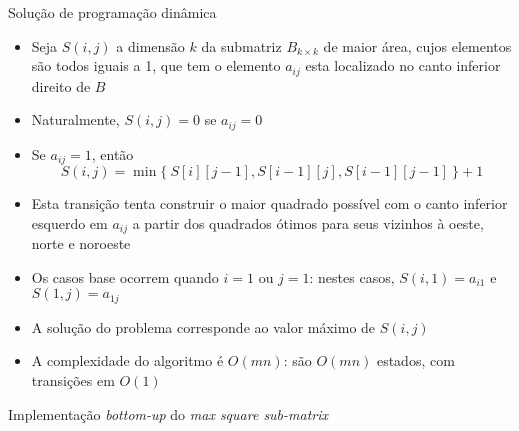 \begin{frame}[fragile]{Solução de programação dinâmica}

    \begin{itemize}
        \item Seja $S(i, j)$ a dimensão $k$ da submatriz $B_{k\times k}$ de maior área, cujos
            elementos são todos iguais a 1, que tem o elemento $a_{ij}$ esta localizado no canto
            inferior direito de $B$

        \item Naturalmente, $S(i, j) = 0$ se $a_{ij} = 0$

        \item Se $a_{ij} = 1$, então
        \[
            S(i, j) = \min\{\ S[i][j - 1], S[i - 1][j], S[i - 1][j - 1]\ \} + 1
        \]

        \item Esta transição tenta construir o maior quadrado possível com o canto inferior
            esquerdo em $a_{ij}$ a partir dos quadrados ótimos para seus vizinhos à oeste, 
            norte e noroeste

        \item Os casos base ocorrem quando $i = 1$ ou $j = 1$: nestes casos, $S(i, 1) = a_{i1}$ e
            $S(1, j) = a_{1j}$

        \item A solução do problema corresponde ao valor máximo de $S(i, j)$

        \item A complexidade do algoritmo é $O(mn)$: são $O(mn)$ estados, com transições em
            $O(1)$
    \end{itemize}

\end{frame}

\begin{frame}[fragile]{Implementação {\it bottom-up} do {\it max square sub-matrix}}
\end{frame}
